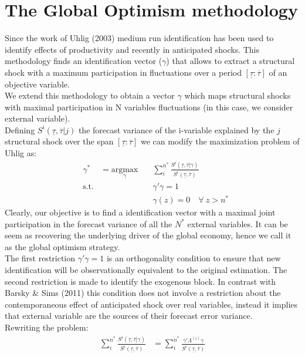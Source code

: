 \documentclass[12pt, a4paper]{article}
\begin{document}
\section{The Global Optimism methodology}
Since the work of Uhlig (2003) medium run identification has been used to identify effects of productivity and recently in anticipated shocks. This methodology finds an identification vector ($\gamma$) that allows to extract a structural shock with a maximum participation in fluctuations over a period $[\underline{\tau}:\overline{\tau}]$ of an objective variable. \\
We extend this methodology to obtain a vector $\gamma$ which maps structural shocks with maximal participation in N variables fluctuations (in this case, we consider external variable). \\
Defining $S^{i}(\underline{\tau},\overline{\tau}|j)$ the forecast variance of the i-variable explained by the $j$ structural shock over the span $[\underline{\tau}:\overline{\tau}]$ we can modify the maximization problem of Uhlig as: 
\begin{equation*}
\begin{aligned}
& \gamma^* &= \underset{\gamma}{\text{argmax}}  \quad
&  \sum_i^{n^*}\frac{S^{i}(\underline{\tau},\overline{\tau}|\gamma)}{S^{i}(\underline{\tau},\overline{\tau})} \\
& \text{s.t.} 
&  & \gamma' \gamma = 1 \\
&  & & \gamma(z)  = 0 \quad \forall \ z>n^*
\end{aligned}
\end{equation*}
Clearly, our objective is to find a identification vector with a maximal joint participation  in the forecast variance of all the $N^*$ external variables. It can be seem as recovering the underlying driver of the global economy, hence we call it as the global optimism strategy.\\
The first restriction $\gamma' \gamma = 1$ is an orthogonality condition to ensure that new identification will be observationally equivalent to the original estimation. The second restriction is made to identify the exogenous block. In contrast with Barsky \& Sims (2011) this condition does not involve a restriction about the contemporaneous effect of anticipated shock over real variables, instead it implies that external variable are the sources of their forecast error variance.\\
Rewriting the problem: 
\begin{equation*}
\begin{aligned}
\sum_i^{n^*}\frac{S^{i}(\underline{\tau},\overline{\tau}|\gamma)}{S^{i}(\underline{\tau},\overline{\tau})} 
 &=  \sum_i^{n^*}\frac{\gamma' \Lambda^{(i)} \gamma}{S^{i}(\underline{\tau},\overline{\tau})} 
\end{aligned}
\end{equation*}
\end{document}
